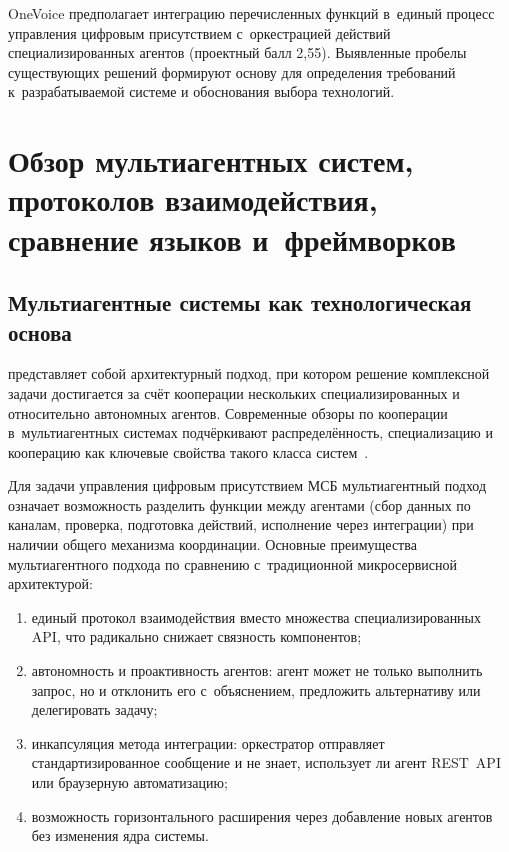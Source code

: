 OneVoice предполагает интеграцию перечисленных функций в~единый процесс управления цифровым присутствием с~оркестрацией действий специализированных агентов (проектный балл 2{,}55). Выявленные пробелы существующих решений формируют основу для определения требований к~разрабатываемой системе и обоснования выбора технологий.


\section{Обзор мультиагентных систем, протоколов взаимодействия, сравнение языков и~фреймворков}
\label{sec:ch1-tech}

\subsection{Мультиагентные системы как технологическая основа}
\label{subsec:mas}

 представляет собой архитектурный подход, при котором решение комплексной задачи достигается за счёт кооперации нескольких специализированных и относительно автономных агентов. Современные обзоры по кооперации в~мультиагентных системах подчёркивают распределённость, специализацию и кооперацию как ключевые свойства такого класса систем~\cite{src:17}.

Для задачи управления цифровым присутствием МСБ мультиагентный подход означает возможность разделить функции между агентами (сбор данных по каналам, проверка, подготовка действий, исполнение через интеграции) при наличии общего механизма координации. Основные преимущества мультиагентного подхода по сравнению с~традиционной микросервисной архитектурой:

\begin{enumerate}
  \item единый протокол взаимодействия вместо множества специализированных API, что радикально снижает связность компонентов;
  \item автономность и проактивность агентов: агент может не только выполнить запрос, но и отклонить его с~объяснением, предложить альтернативу или делегировать задачу;
  \item инкапсуляция метода интеграции: оркестратор отправляет стандартизированное сообщение и не знает, использует ли агент REST~API или браузерную автоматизацию;
  \item возможность горизонтального расширения через добавление новых агентов без изменения ядра системы.
\end{enumerate}

